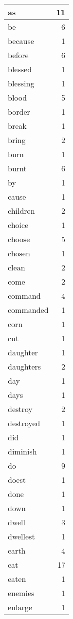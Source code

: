 \begin{center}
\begin{longtable}{l|r}
as & 11 \\ \hline
be & 6 \\ \hline
because & 1 \\ \hline
before & 6 \\ \hline
blessed & 1 \\ \hline
blessing & 1 \\ \hline
blood & 5 \\ \hline
border & 1 \\ \hline
break & 1 \\ \hline
bring & 2 \\ \hline
burn & 1 \\ \hline
burnt & 6 \\ \hline
by & 1 \\ \hline
cause & 1 \\ \hline
children & 2 \\ \hline
choice & 1 \\ \hline
choose & 5 \\ \hline
chosen & 1 \\ \hline
clean & 2 \\ \hline
come & 2 \\ \hline
command & 4 \\ \hline
commanded & 1 \\ \hline
corn & 1 \\ \hline
cut & 1 \\ \hline
daughter & 1 \\ \hline
daughters & 2 \\ \hline
day & 1 \\ \hline
days & 1 \\ \hline
destroy & 2 \\ \hline
destroyed & 1 \\ \hline
did & 1 \\ \hline
diminish & 1 \\ \hline
do & 9 \\ \hline
doest & 1 \\ \hline
done & 1 \\ \hline
down & 1 \\ \hline
dwell & 3 \\ \hline
dwellest & 1 \\ \hline
earth & 4 \\ \hline
eat & 17 \\ \hline
eaten & 1 \\ \hline
enemies & 1 \\ \hline
enlarge & 1 \\ \hline

\end{longtable}
\end{center}
